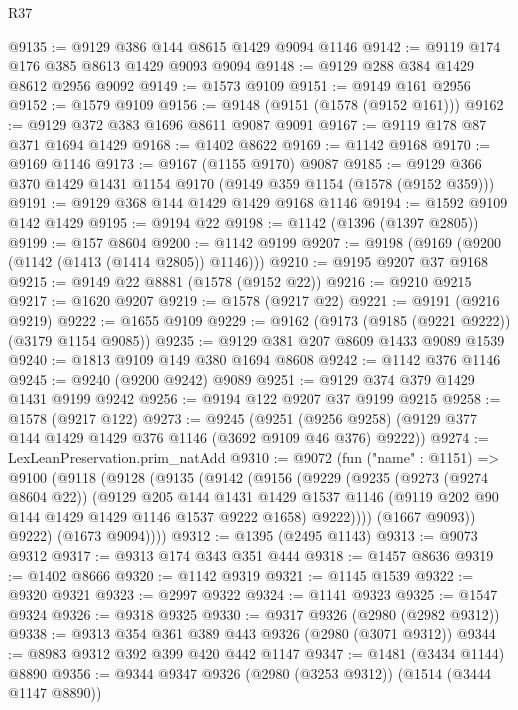 \begin{lexlean}{R37}
\begin{coremodule}
@9135 := @9129 @386 @144 @8615 @1429 @9094 @1146
@9142 := @9119 @174 @176 @385 @8613 @1429 @9093 @9094
@9148 := @9129 @288 @384 @1429 @8612 @2956 @9092
@9149 := @1573 @9109
@9151 := @9149 @161 @2956
@9152 := @1579 @9109
@9156 := @9148 (@9151 (@1578 (@9152 @161)))
@9162 := @9129 @372 @383 @1696 @8611 @9087 @9091
@9167 := @9119 @178 @87 @371 @1694 @1429
@9168 := @1402 @8622
@9169 := @1142 @9168
@9170 := @9169 @1146
@9173 := @9167 (@1155 @9170) @9087
@9185 := @9129 @366 @370 @1429 @1431 @1154 @9170 (@9149 @359 @1154 (@1578 (@9152 @359)))
@9191 := @9129 @368 @144 @1429 @1429 @9168 @1146
@9194 := @1592 @9109 @142 @1429
@9195 := @9194 @22
@9198 := @1142 (@1396 (@1397 @2805))
@9199 := @157 @8604
@9200 := @1142 @9199
@9207 := @9198 (@9169 (@9200 (@1142 (@1413 (@1414 @2805)) @1146)))
@9210 := @9195 @9207 @37 @9168
@9215 := @9149 @22 @8881 (@1578 (@9152 @22))
@9216 := @9210 @9215
@9217 := @1620 @9207
@9219 := @1578 (@9217 @22)
@9221 := @9191 (@9216 @9219)
@9222 := @1655 @9109
@9229 := @9162 (@9173 (@9185 (@9221 @9222)) (@3179 @1154 @9085))
@9235 := @9129 @381 @207 @8609 @1433 @9089 @1539
@9240 := @1813 @9109 @149 @380 @1694 @8608
@9242 := @1142 @376 @1146
@9245 := @9240 (@9200 @9242) @9089
@9251 := @9129 @374 @379 @1429 @1431 @9199 @9242
@9256 := @9194 @122 @9207 @37 @9199 @9215
@9258 := @1578 (@9217 @122)
@9273 := @9245
    (@9251 (@9256 @9258) (@9129 @377 @144 @1429 @1429 @376 @1146 (@3692 @9109 @46 @376) @9222))
@9274 := LexLeanPreservation.prim_natAdd
@9310 := @9072
    (fun ("name" : @1151) =>
    @9100
      (@9118
        (@9128
          (@9135
            (@9142
              (@9156
                (@9229
                  (@9235
                    (@9273 (@9274 @8604 @22))
                    (@9129
                      @205
                      @144
                      @1431
                      @1429
                      @1537
                      @1146
                      (@9119 @202 @90 @144 @1429 @1429 @1146 @1537 @9222 @1658)
                      @9222))))
              (@1667 @9093))
            @9222)
          (@1673 @9094))))
@9312 := @1395 (@2495 @1143)
@9313 := @9073 @9312
@9317 := @9313 @174 @343 @351 @444
@9318 := @1457 @8636
@9319 := @1402 @8666
@9320 := @1142 @9319
@9321 := @1145 @1539
@9322 := @9320 @9321
@9323 := @2997 @9322
@9324 := @1141 @9323
@9325 := @1547 @9324
@9326 := @9318 @9325
@9330 := @9317 @9326 (@2980 (@2982 @9312))
@9338 := @9313 @354 @361 @389 @443 @9326 (@2980 (@3071 @9312))
@9344 := @8983 @9312 @392 @399 @420 @442 @1147
@9347 := @1481 (@3434 @1144) @8890
@9356 := @9344 @9347 @9326 (@2980 (@3253 @9312)) (@1514 (@3444 @1147 @8890))

\end{coremodule}
\end{lexlean}
